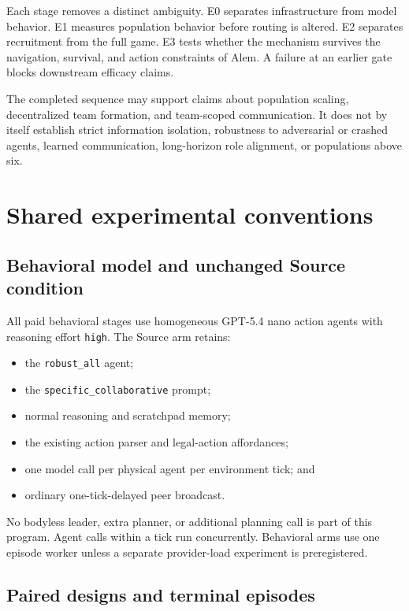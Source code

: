 \documentclass[11pt]{article}
\newcommand{\code}[1]{\texttt{#1}}
\begin{document}
Each stage removes a distinct ambiguity.  E0 separates infrastructure from
model behavior.  E1 measures population behavior before routing is altered.
E2 separates recruitment from the full game.  E3 tests whether the mechanism
survives the navigation, survival, and action constraints of Alem.  A failure
at an earlier gate blocks downstream efficacy claims.

The completed sequence may support claims about population scaling,
decentralized team formation, and team-scoped communication.  It does not by
itself establish strict information isolation, robustness to adversarial or
crashed agents, learned communication, long-horizon role alignment, or
populations above six.

\section{Shared experimental conventions}

\subsection{Behavioral model and unchanged Source condition}

All paid behavioral stages use homogeneous GPT-5.4 nano action agents with
reasoning effort \code{high}.  The Source arm retains:

\begin{itemize}
  \item the \code{robust\_all} agent;
  \item the \code{specific\_collaborative} prompt;
  \item normal reasoning and scratchpad memory;
  \item the existing action parser and legal-action affordances;
  \item one model call per physical agent per environment tick; and
  \item ordinary one-tick-delayed peer broadcast.
\end{itemize}

No bodyless leader, extra planner, or additional planning call is part of this
program.  Agent calls within a tick run concurrently.  Behavioral arms use one
episode worker unless a separate provider-load experiment is preregistered.

\subsection{Paired designs and terminal episodes}
\end{document}

